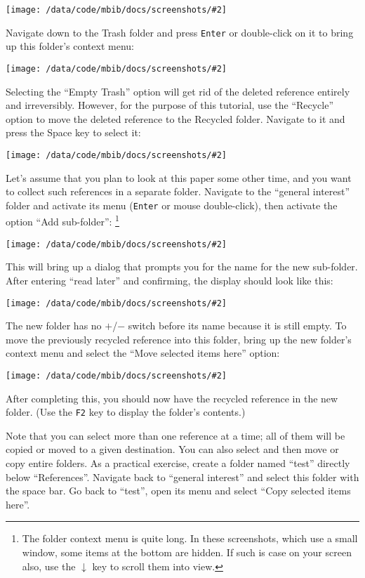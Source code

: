\documentclass[10pt]{article}
\newcommand*{\key}[1]{\texttt{#1}\xspace}
\newcommand*{\arrowdown}{\key{$\downarrow$}}
\newcommand{\screenshot}[2][]{%
\medskip\par
\begin{center}
\texttt{[image: /data/code/mbib/docs/screenshots/\#2]}
\end{center}}
\begin{document}
\screenshot{harrit-trash}

\noindent Navigate down to the Trash folder and press \key{Enter} or double-click on it to bring up this folder's context menu:

\screenshot{trash-menu}

\noindent Selecting the ``Empty Trash'' option will get rid of the deleted reference entirely and irreversibly. However, for the purpose of this tutorial, use the ``Recycle'' option to move the deleted reference to the Recycled folder. Navigate to it and press the Space key to select it: 

\screenshot{harrit-recycled}

\noindent Let's assume that you plan to look at this paper some other time, and you want to collect such references in a separate folder. Navigate to the ``general interest'' folder and activate its menu (\key{Enter} or mouse double-click), then activate the option ``Add sub-folder'':%
%
\footnote{The folder context menu is quite long. In these screenshots, which use a small window, some items at the bottom are hidden. If such is case on your screen also, use the \arrowdown key to scroll them into view.}

\screenshot{folder-menu}

\noindent This will bring up a dialog that prompts you for the name for the new sub-folder. After entering ``read later'' and confirming, the display should look like this:

\screenshot{read-later}

\noindent The new folder has no $+$/$-$ switch before its name because it is still empty. To move the previously recycled reference into this folder, bring up the new folder's context menu and select the ``Move selected items here'' option:

\screenshot{move-here}

\noindent After completing this, you should now have the recycled reference in the new folder. (Use the \key{F2} key to display the folder's contents.)

Note that you can select more than one reference at a time; all of them will be copied or moved to a given destination. You can also select and then move or copy entire folders. As a practical exercise, create a folder named ``test'' directly below ``References''. Navigate back to ``general interest'' and select this folder with the space bar. Go back to ``test'', open its menu and select ``Copy selected items here''. 
\end{document}
